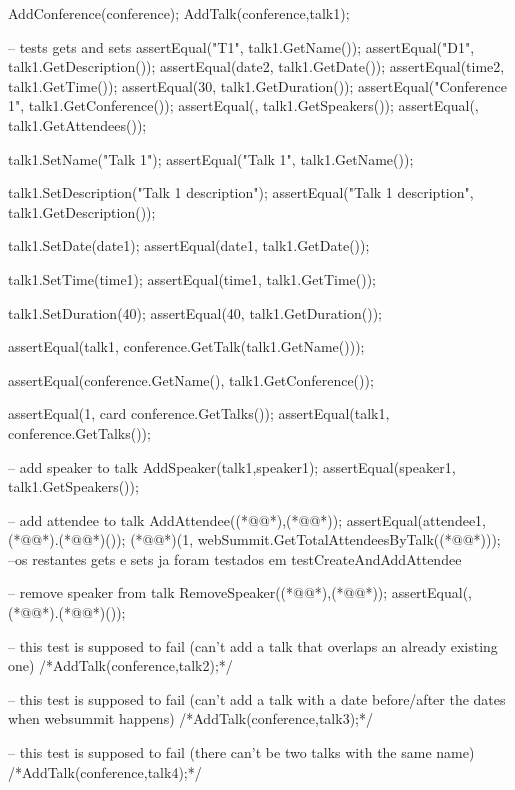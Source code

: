 \begin{vdmpp}[breaklines=true]
  AddConference(conference);
  AddTalk(conference,talk1);
 
   -- tests gets and sets
   assertEqual("T1", talk1.GetName());
  assertEqual("D1", talk1.GetDescription());
  assertEqual(date2, talk1.GetDate());
  assertEqual(time2, talk1.GetTime());
  assertEqual(30, talk1.GetDuration());
  assertEqual("Conference 1", talk1.GetConference());
  assertEqual({}, talk1.GetSpeakers());
  assertEqual({}, talk1.GetAttendees());
  
  talk1.SetName("Talk 1");
  assertEqual("Talk 1", talk1.GetName());
  
  talk1.SetDescription("Talk 1 description");
  assertEqual("Talk 1 description", talk1.GetDescription());
  
  talk1.SetDate(date1);
  assertEqual(date1, talk1.GetDate());
  
  talk1.SetTime(time1);
  assertEqual(time1, talk1.GetTime());
  
  talk1.SetDuration(40);
  assertEqual(40, talk1.GetDuration());
  
  assertEqual(talk1, conference.GetTalk(talk1.GetName()));
  
  assertEqual(conference.GetName(), talk1.GetConference());
  
  assertEqual(1, card conference.GetTalks());
  assertEqual({talk1}, conference.GetTalks());
  
  -- add speaker to talk
  AddSpeaker(talk1,speaker1);
  assertEqual({speaker1}, talk1.GetSpeakers());
  
  -- add attendee to talk
  AddAttendee((*@@*),(*@@*));
  assertEqual({attendee1}, (*@@*).(*@@*)());
  (*@@*)(1, webSummit.GetTotalAttendeesByTalk((*@@*)));
  --os restantes gets e sets ja foram testados em testCreateAndAddAttendee
  
  -- remove speaker from talk
  RemoveSpeaker((*@@*),(*@@*));
  assertEqual({}, (*@@*).(*@@*)());
  
  -- this test is supposed to fail (can't add a talk that overlaps an already existing one)
  /*AddTalk(conference,talk2);*/
  
  -- this test is supposed to fail (can't add a talk with a date before/after the dates when websummit happens)
  /*AddTalk(conference,talk3);*/
  
  -- this test is supposed to fail (there can't be two talks with the same name)
  /*AddTalk(conference,talk4);*/
  

\end{vdmpp}
